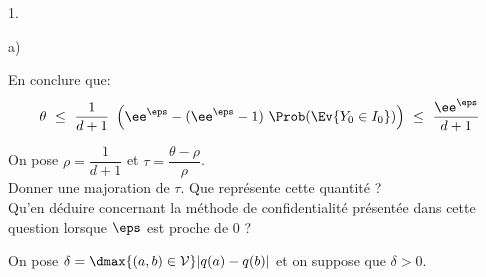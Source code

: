 \documentclass[11pt]{article}%
\begin{document}
\begin{noliste}{1.}
\begin{noliste}{a)}
    
    
    
    
    

  \item En conclure que:
    \[
    \theta \ \leq \ \dfrac{1}{d+1} \ \left(\ee^{\eps} - (\ee^{\eps}-1)
      \ \Prob(\Ev{Y_0\in I_0}) \right) \ \leq \
    \dfrac{\ee^{\eps}}{d+1}
    \]

    

  \item On pose $\rho = \dfrac{1}{d+1}$ et $\tau = \dfrac{\theta -
      \rho}{\rho}$.\\
    Donner une majoration de $\tau$. Que représente cette quantité ?\\
    Qu'en déduire concernant la méthode de confidentialité présentée
    dans cette question lorsque $\eps$ est proche de $0$ ?

    
  \end{noliste}
\end{noliste}
On pose $\delta = \dmax{(a,b)\in\cal V} |q(a)-q(b)|$ et on suppose que
$\delta > 0$.
\end{document}
